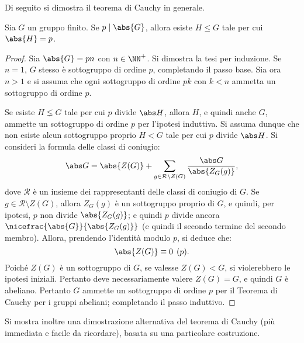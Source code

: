\documentclass[12pt]{scrartcl}
\begin{document}
	Di seguito si dimostra il teorema di Cauchy in generale.
	
	\begin{theorem}[di Cauchy]
		Sia $G$ un gruppo finito. Se $p \mid \abs{G}$, allora
		esiste $H \leq G$ tale per cui $\abs{H} = p$.
	\end{theorem}
	
	\begin{proof}
		Sia $\abs{G} = pn$ con $n \in \NN^+$. Si dimostra la tesi per induzione.
		Se $n = 1$, $G$ stesso è sottogruppo di ordine $p$, completando il passo
		base. Sia ora $n > 1$ e si assuma che ogni sottogruppo di ordine $pk$ con
		$k < n$ ammetta un sottogruppo di ordine $p$. \medskip
		
		
		Se esiste $H \lneq G$ tale per cui $p$ divide $\abs H$, allora $H$, e quindi
		anche $G$, ammette un sottogruppo di ordine $p$ per l'ipotesi induttiva.
		Si assuma dunque che non esiste alcun sottogruppo proprio $H < G$ tale
		per cui $p$ divide $\abs H$. Si consideri la formula delle classi
		di coniugio:
		\[ \abs G = \abs{Z(G)} + \sum_{g \in \mathcal{R} \setminus Z(G)} \frac{\abs G}{\abs{Z_G(g)}}, \]
		dove $\mathcal{R}$ è un insieme dei rappresentanti delle classi di coniugio
		di $G$. Se $g \in \mathcal{R} \setminus Z(G)$, allora $Z_G(g)$ è un sottogruppo
		proprio di $G$, e quindi, per ipotesi, $p$ non divide $\abs{Z_G(g)}$; e quindi
		$p$ divide ancora $\nicefrac{\abs{G}}{\abs{Z_G(g)}}$ (e quindi il secondo termine
		del secondo membro). Allora, prendendo
		l'identità modulo $p$, si deduce che:
		\[ \abs{Z(G)} \equiv 0 \pod p. \]		
		Poiché $Z(G)$ è un sottogruppo di $G$, se valesse $Z(G) < G$, si violerebbero
		le ipotesi iniziali. Pertanto deve necessariamente valere $Z(G) = G$, e quindi
		$G$ è abeliano. Pertanto $G$ ammette un sottogruppo di ordine $p$ per il Teorema
		di Cauchy per i gruppi abeliani; completando il passo induttivo.
	\end{proof} \smallskip
	
	
	Si mostra inoltre una dimostrazione alternativa del teorema di Cauchy (più immediata
	e facile da ricordare), basata su una particolare costruzione.
	
\end{document}
